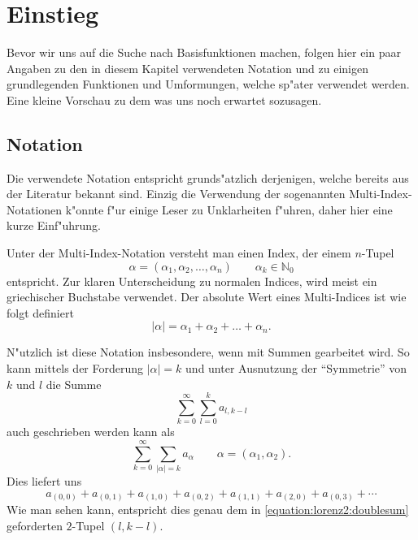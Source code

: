 \section{Einstieg\label{section:lorenz2:einstieg}}

Bevor wir uns auf die Suche nach Basisfunktionen machen, folgen hier ein paar 
Angaben zu den in diesem Kapitel verwendeten Notation und zu einigen 
grundlegenden Funktionen und Umformungen, welche sp"ater verwendet werden. Eine 
kleine Vorschau zu dem was uns noch erwartet sozusagen.

\subsection{Notation}
Die verwendete Notation entspricht grunds"atzlich derjenigen, welche 
bereits aus der Literatur bekannt sind. Einzig die Verwendung der 
sogenannten Multi-Index-Notationen k"onnte f"ur einige Leser zu Unklarheiten 
f"uhren, daher hier eine kurze Einf"uhrung.

Unter der Multi-Index-Notation versteht man einen Index, der einem 
$n$-Tupel
\begin{equation*}
	\alpha = (\alpha_1, \alpha_2, \dotsc, \alpha_n) \qquad \alpha_k \in 
	\mathbb{N}_{0}
\end{equation*}
entspricht. Zur klaren Unterscheidung zu normalen Indices, wird meist ein 
griechischer Buchstabe verwendet. Der absolute Wert eines Multi-Indices ist wie 
folgt definiert
\begin{equation*}
	|\alpha| = \alpha_1 + \alpha_2 + \dots + \alpha_n.
\end{equation*}
 
N"utzlich ist diese Notation insbesondere, wenn mit Summen gearbeitet wird. So 
kann mittels der Forderung $|\alpha| = k$ und unter Ausnutzung der 
``Symmetrie'' von $k$ und $l$ die Summe
\begin{equation}
	\sum_{k = 0}^{\infty}\sum_{l = 0}^{k}a_{l, k - l}
	\label{equation:lorenz2:doublesum}
\end{equation}
auch geschrieben werden kann als
\begin{equation*}
	\sum_{k = 0}^{\infty}\sum_{|\alpha| = k}a_{\alpha}
	\qquad \alpha = (\alpha_1, \alpha_2).
\end{equation*}
Dies liefert uns
\begin{equation*}
	a_{(0,0)} + a_{(0,1)} + a_{(1,0)} + a_{(0,2)} + a_{(1,1)} + a_{(2,0)} + 
	a_{(0,3)} + 
	\dotsb
\end{equation*}
Wie man sehen kann, entspricht dies genau dem in 
\cref{equation:lorenz2:doublesum} geforderten $2$-Tupel $(l, k - l)$.

